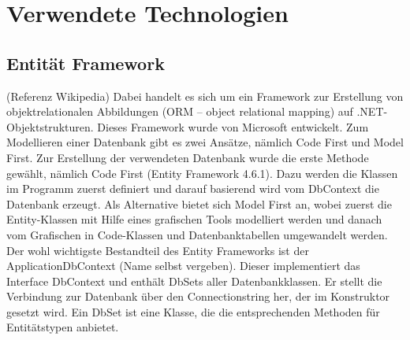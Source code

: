 \chapter{Verwendete Technologien}\label{cha:theoretical-background}
\section{Entität Framework}
(Referenz Wikipedia)
Dabei handelt es sich um ein Framework zur Erstellung von objektrelationalen Abbildungen (ORM – object relational mapping) auf .NET-Objektstrukturen. Dieses Framework wurde von Microsoft entwickelt.
\newline
Zum Modellieren einer Datenbank gibt es zwei Ansätze, nämlich Code First und Model First. Zur Erstellung der verwendeten Datenbank wurde die erste Methode gewählt, nämlich Code First (Entity Framework 4.6.1). Dazu werden die Klassen im Programm zuerst definiert und darauf basierend wird vom DbContext die Datenbank erzeugt. Als Alternative bietet sich Model First an, wobei zuerst die Entity-Klassen mit Hilfe eines grafischen Tools modelliert werden und danach vom Grafischen in Code-Klassen und Datenbanktabellen umgewandelt werden.
Der wohl wichtigste Bestandteil des Entity Frameworks ist der ApplicationDbContext (Name selbst vergeben). Dieser implementiert das Interface DbContext und enthält DbSets aller Datenbankklassen. Er stellt die Verbindung zur Datenbank über den Connectionstring her, der im Konstruktor gesetzt wird.  
\newline Ein DbSet ist eine Klasse, die die entsprechenden Methoden für Entitätstypen anbietet.
